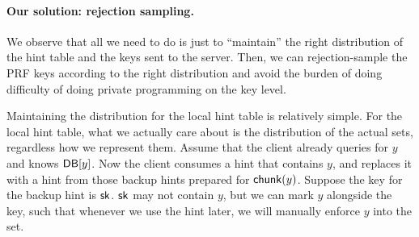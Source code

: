 \paragraph{Our solution: rejection sampling.} 
We observe that all we need to do is just to ``maintain'' the right distribution
of the hint table and the keys sent to the server. Then, we can rejection-sample
the PRF keys according to the right distribution and avoid the burden of doing
difficulty of doing private programming on the key level.

Maintaining the distribution for the local hint table is relatively simple. For
the local hint table, what we actually care about is the distribution of the
actual sets, regardless how we represent them. Assume that the client already
queries for $y$ and knows $\mathsf{DB}[y]$. Now the client consumes a hint that contains
$y$, and replaces it with a hint from those backup hints prepared for
$\mathsf{chunk}(y)$. Suppose the key for the backup hint is $\mathsf{sk}$. $\mathsf{sk}$ may not contain
$y$, but we can mark $y$ alongside the key, such that whenever we use the hint
later, we will manually enforce $y$ into the set.
